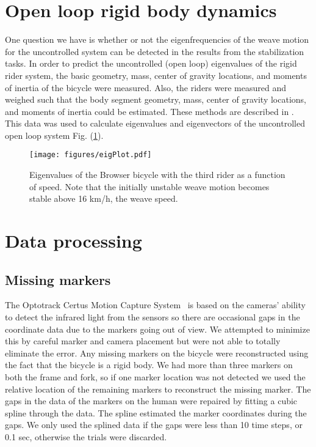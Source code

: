 \section{Open loop rigid body dynamics}
\label{sec:openLoop}
One question we have is whether or not the eigenfrequencies of the weave motion
for the uncontrolled system can be detected in the results from the
stabilization tasks. In order to predict the uncontrolled (open loop)
eigenvalues of the rigid rider system, the basic geometry, mass, center of
gravity locations, and moments of inertia of the bicycle were measured. Also,
the riders were measured and weighed such that the body segment geometry, mass,
center of gravity locations, and moments of inertia could be estimated. These
methods are described in \cite{Moore2009a}. This data was used to calculate
eigenvalues and eigenvectors of the uncontrolled open loop system Fig.
(\ref{fig:eigPlot}).
\begin{figure}[]
    \begin{center}
        \texttt{[image: figures/eigPlot.pdf]}
    \end{center}
    \caption{Eigenvalues of the Browser bicycle with the third rider as a
    function of speed. Note that the initially unstable weave motion becomes
    stable above 16 km/h, the weave speed.}
    \label{fig:eigPlot}
\end{figure}

\section{Data processing}
\label{sec:data}

\subsection{Missing markers}
\label{sec:missingMarkers}
The Optotrack Certus Motion Capture
System~\cite{NorthernDigitalIncorporated2009} is based on the cameras' ability
to detect the infrared light from the sensors so there are occasional gaps in
the coordinate data due to the markers going out of view. We attempted to
minimize this by careful marker and camera placement but were not able to
totally eliminate the error. Any missing markers on the bicycle were
reconstructed using the fact that the bicycle is a rigid body. We had more than
three markers on both the frame and fork, so if one marker location was not
detected we used the relative location of the remaining markers to reconstruct
the missing marker. The gaps in the data of the markers on the human were
repaired by fitting a cubic spline through the data. The spline estimated the
marker coordinates during the gaps. We only used the splined data if the gaps
were less than 10 time steps, or 0.1 sec, otherwise the trials were discarded.

